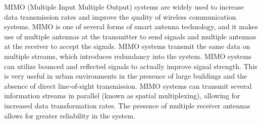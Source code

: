  \label{chap:gram_schmidt}

\vspace*{-17 pt}

\vspace*{13 pt}

\label{sec:mimo}

MIMO (Multiple Input Multiple Output) systems are widely used to increase data transmission rates and improve the quality of wireless communication systems.  MIMO is one of several forms of smart antenna technology, and it makes use of multiple antennas at the transmitter to send signals and multiple antennas at the receiver to accept the signals. MIMO systems transmit the same data on multiple streams, which introduces redundancy into the system. MIMO systems can utilize bounced and reflected signals to actually improve signal strength. This is very useful in urban environments in the presence of large buildings and the absence of direct line-of-sight transmission. MIMO systems can transmit several information streams in parallel (known as spatial multiplexing), allowing for increased data transformation rates. The presence of multiple receiver antennas allows for greater reliability in the system. 

